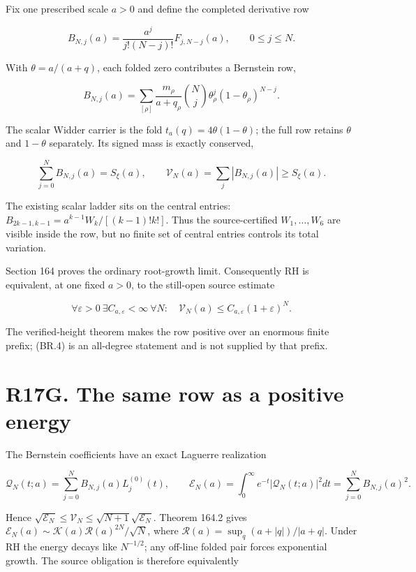 \documentclass[
  11pt,
]{book}
\begin{document}
Fix one prescribed scale \(a>0\) and define the completed derivative row

\[
\boxed{B_{N,j}(a)=\frac{a^j}{j!(N-j)!}F_{j,N-j}(a),
\qquad0\le j\le N.}
\tag{BR.1}
\]

With \(\theta=a/(a+q)\), each folded zero contributes a Bernstein row,

\[
B_{N,j}(a)=\sum_{[\rho]}\frac{m_\rho}{a+q_\rho}
\binom Nj\theta_\rho^j(1-\theta_\rho)^{N-j}.
\tag{BR.2}
\]

The scalar Widder carrier is the fold \(t_a(q)=4\theta(1-\theta)\); the
full row retains \(\theta\) and \(1-\theta\) separately. Its signed mass
is exactly conserved,

\[
\sum_{j=0}^NB_{N,j}(a)=S_\xi(a),
\qquad
\mathcal V_N(a)=\sum_j|B_{N,j}(a)|\ge S_\xi(a).
\tag{BR.3}
\]

The existing scalar ladder sits on the central entries:
\(B_{2k-1,k-1}=a^{k-1}W_k/[(k-1)!k!]\). Thus the source-certified
\(W_1,\ldots,W_6\) are visible inside the row, but no finite set of
central entries controls its total variation.

Section 164 proves the ordinary root-growth limit. Consequently RH is
equivalent, at one fixed \(a>0\), to the still-open source estimate

\[
\boxed{\forall\varepsilon>0\ \exists C_{a,\varepsilon}<\infty\ \forall N:\quad
\mathcal V_N(a)\le C_{a,\varepsilon}(1+\varepsilon)^N.}
\tag{BR.4}
\]

The verified-height theorem makes the row positive over an enormous
finite prefix; (BR.4) is an all-degree statement and is not supplied by
that prefix.

\section{R17G. The same row as a positive
energy}\label{r17g.-the-same-row-as-a-positive-energy}

The Bernstein coefficients have an exact Laguerre realization

\[
\mathcal Q_N(t;a)=\sum_{j=0}^NB_{N,j}(a)L_j^{(0)}(t),
\qquad
\mathscr E_N(a)=\int_0^\infty e^{-t}|\mathcal Q_N(t;a)|^2dt
=\sum_{j=0}^NB_{N,j}(a)^2.
\tag{BE.2}
\]

Hence
\(\sqrt{\mathscr E_N}\le\mathcal V_N\le\sqrt{N+1}\sqrt{\mathscr E_N}\).
Theorem 164.2 gives
\(\mathscr E_N(a)\sim\mathcal K(a)\mathcal R(a)^{2N}/\sqrt N\), where
\(\mathcal R(a)=\sup_q(a+|q|)/|a+q|\). Under RH the energy decays like
\(N^{-1/2}\); any off-line folded pair forces exponential growth. The
source obligation is therefore equivalently
\end{document}
